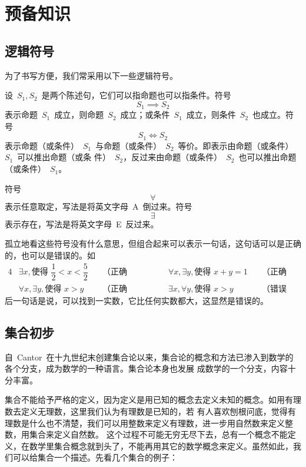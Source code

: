 

\chapter{预备知识}\label{ch:0}

\section{逻辑符号}

为了书写方便，我们常采用以下一些逻辑符号。

设~$S_1,S_2$~是两个陈述句，它们可以指命题也可以指条件。符号
\[
  S_1\implies S_2
\]
表示命题~$S_1$~成立，则命题~$S_2$~成立；或条件~$S_1$~成立，则条件~$S_2$~也成立。符号
\[
  S_1\iff S_2
\]
表示命题（或条件）~$S_1$~与命题（或条件）~$S_2$~等价。即表示由命题（或条件）~$S_1$~可以推出命题（或条
件）~$S_2$，反过来由命题（或条件）~$S_2$~也可以推出命题（或条件）~$S_1$。

符号
\[
  \forall
\]
表示任意取定，写法是将英文字母~A~倒过来。符号
\[
  \exists
\]
表示存在，写法是将英文字母~E~反过来。

孤立地看这些符号没有什么意思，但组合起来可以表示一句话，这句话可以是正确的，也可以是错误的。如
\begin{alignat*}{4}
&\exists x,\text{使得~}\dfrac 12<x<\dfrac 52 &\enspace&\text{（正确的）；}
&\qquad&\forall x,\exists y,\text{使得~}x+y=1 &\enspace&\text{（正确的）；}\\
&\forall x,\exists y,\text{使得~}x>y & &\text{（正确的）；}
&\qquad&\exists x,\forall y,\text{使得~}x>y & &\text{（错误的）。}
\end{alignat*}
后一句话是说，可以找到一实数，它比任何实数都大，这显然是错误的。

\section{集合初步}

自~Cantor~在十九世纪末创建集合论以来，集合论的概念和方法已渗入到数学的各个分支，成为数学的一种语言。集合论本身也发展
成数学的一个分支，内容十分丰富。

集合不能给予严格的定义，因为定义是用已知的概念去定义未知的概念。如用有理数去定义无理数，这里我们认为有理数是已知的，若
有人喜欢刨根问底，觉得有理数是什么也不清楚，我们可以用整数来定义有理数，进一步用自然数来定义整数，用集合来定义自然数。%
这个过程不可能无穷无尽下去，总有一个概念不能定义，在数学里集合概念就到头了，不能再用其它的数学概念来定义。虽然如此，我
们可以给集合一个描述。先看几个集合的例子：

